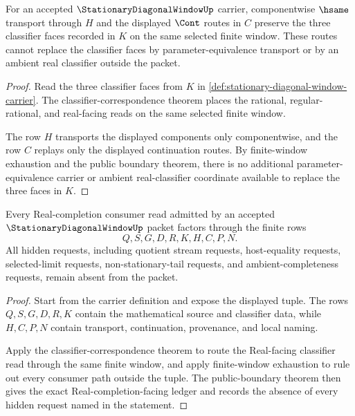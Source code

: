 \begin{theorem}
\label{thm:stationary-diagonal-window-classifier-stability-obligation}
For an accepted $\StationaryDiagonalWindowUp$ carrier, componentwise $\hsame$ transport through $H$ and the displayed $\Cont$ routes in $C$ preserve the three classifier faces recorded in $K$ on the same selected finite window. These routes cannot replace the classifier faces by parameter-equivalence transport or by an ambient real classifier outside the packet.
\end{theorem}
\begin{proof}
Read the three classifier faces from $K$ in \autoref{def:stationary-diagonal-window-carrier}. The classifier-correspondence theorem places the rational, regular-rational, and real-facing reads on the same selected finite window.

The row $H$ transports the displayed components only componentwise, and the row $C$ replays only the displayed continuation routes. By finite-window exhaustion and the public boundary theorem, there is no additional parameter-equivalence carrier or ambient real-classifier coordinate available to replace the three faces in $K$.
\end{proof}

\begin{theorem}
\label{thm:stationary-diagonal-window-ledger-exactness-obligation}
Every Real-completion consumer read admitted by an accepted $\StationaryDiagonalWindowUp$ packet factors through the finite rows
$$
Q,S,G,D,R,K,H,C,P,N.
$$
All hidden requests, including quotient stream requests, host-equality requests, selected-limit requests, non-stationary-tail requests, and ambient-completeness requests, remain absent from the packet.
\end{theorem}
\begin{proof}
Start from the carrier definition and expose the displayed tuple. The rows $Q,S,G,D,R,K$ contain the mathematical source and classifier data, while $H,C,P,N$ contain transport, continuation, provenance, and local naming.

Apply the classifier-correspondence theorem to route the Real-facing classifier read through the same finite window, and apply finite-window exhaustion to rule out every consumer path outside the tuple. The public-boundary theorem then gives the exact Real-completion-facing ledger and records the absence of every hidden request named in the statement.
\end{proof}


